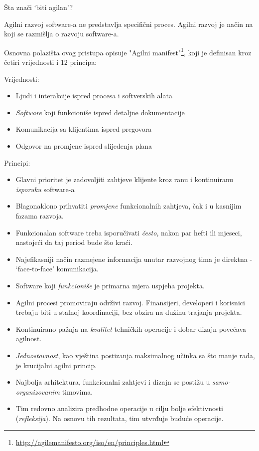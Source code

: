 \documentclass[lmodern, utf8, zavrsni]{fit}
\begin{document}
Šta znači `biti agilan'?

Agilni razvoj software-a ne predstavlja specifični proces. Agilni razvoj je način na koji se razmišlja o razvoju software-a\citep[str. 9]{agileart}.

Osnovna polazišta ovog pristupa opisuje "Agilni manifest"\footnote{\url{http://agilemanifesto.org/iso/en/principles.html}}, koji je definisan kroz četiri vrijednosti i 12 principa:

Vrijednosti:
\begin{itemize}
\item Ljudi i interakcije ispred procesa i softverskih alata
\item \emph{Software} koji funkcioniše ispred detaljne dokumentacije
\item Komunikacija sa klijentima ispred pregovora
\item Odgovor na promjene ispred slijeđenja plana
\end{itemize}

Principi:
\begin{itemize}
\item Glavni prioritet je zadovoljiti zahtjeve klijente kroz ranu i kontinuiranu \emph{isporuku} software-a
\item Blagonaklono prihvatiti \emph{promjene} funkcionalnih zahtjeva, čak i u kasnijim fazama razvoja.
\item Funkcionalan software treba isporučivati \emph{često}, nakon par hefti ili mjeseci, nastojeći da taj period bude što kraći.
\item Najefikasniji način razmejene informacija unutar razvojnog tima je direktna - `face-to-face' komunikacija.
\item Software koji \emph{funkcioniše} je primarna mjera uspjeha projekta.
\item Agilni procesi promoviraju održivi razvoj. Finansijeri, developeri i korisnici trebaju biti u stalnoj koordinaciji, bez obzira na dužinu trajanja projekta.
\item Kontinuirano pažnja na \emph{kvalitet} tehničkih operacije i dobar dizajn povećava agilnost.
\item \emph{Jednostavnost}, kao vještina postizanja maksimalnog učinka sa što manje rada, je krucijalni agilni princip.
\item Najbolja arhitektura, funkcionalni zahtjevi i dizajn se postižu u \emph{samo-organizovanim} timovima.
\item Tim redovno analizira predhodne operacije u cilju bolje efektivnosti (\emph{refleksija}). Na osnovu tih rezultata, tim utvrđuje buduće operacije.
\end{itemize}
\end{document}
